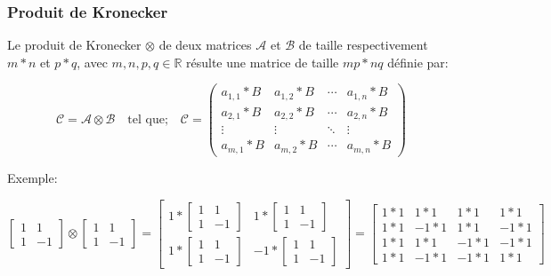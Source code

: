 \documentclass{article}
\begin{document}
\subsubsection{Produit de Kronecker}

Le produit de Kronecker $\otimes$ de deux matrices $\mathcal{A}$ et 
$\mathcal{B}$ de taille respectivement $m*n$ et $p*q$, avec 
$m, n, p, q \in \mathbb{R}$ résulte une matrice de taille $mp*nq$ définie
par:

\begin{equation*}
	\mathcal{C} = \mathcal{A} \otimes \mathcal{B}
	\quad
	\text{tel que;}
	\quad
	\mathcal{C} =
	\begin{pmatrix}
		a_{1,1}*B & a_{1,2}*B & \cdots & a_{1,n}*B\\
		a_{2,1}*B & a_{2,2}*B & \cdots & a_{2,n}*B\\
		\vdots & \vdots & \ddots & \vdots\\
		a_{m,1}*B & a_{m,2}*B & \cdots & a_{m,n}*B
	\end{pmatrix}
\end{equation*}

Exemple:

\begin{equation*}
	\begin{bmatrix}
		1 & 1\\
		1 & -1
	\end{bmatrix}
	\otimes
	\begin{bmatrix}
		1 & 1\\
		1 & -1
	\end{bmatrix}
	=
	\begin{bmatrix}
		1 * 
		\begin{bmatrix}
			1 & 1\\
			1 & -1
		\end{bmatrix} 
		& 1 * 
		\begin{bmatrix}
			1 & 1\\
			1 & -1
		\end{bmatrix}\\
		1 *
		\begin{bmatrix}
			1 & 1\\
			1 & -1
		\end{bmatrix} 
		& -1 *
		\begin{bmatrix}
			1 & 1\\
			1 & -1
		\end{bmatrix}
	\end{bmatrix}
	=
	\begin{bmatrix}
		1*1 & 1*1 & 1*1 & 1*1\\
		1*1 & -1*1 & 1*1 & -1*1\\
		1*1 & 1*1 & -1*1 & -1*1\\
		1*1 & -1*1 & -1*1 & 1*1
	\end{bmatrix}
\end{equation*}
\end{document}
